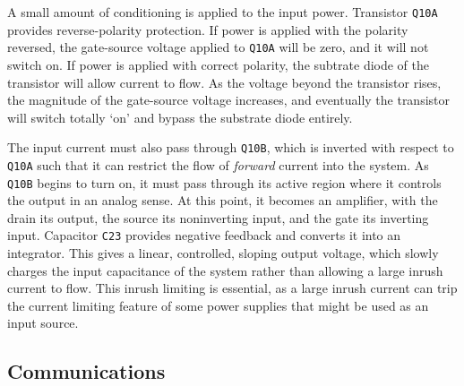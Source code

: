 \documentclass[a4paper,twocolumn,10pt,openany,oneside,final,fleqn]{memoir}
\newcommand{\rd}[1]{\texttt{#1}}
\begin{document}
A small amount of conditioning is applied to the input power. Transistor \rd{Q10A}
provides reverse-polarity protection. If power is applied with the polarity reversed,
the gate-source voltage applied to \rd{Q10A} will be zero, and it will not switch
on. If power is applied with correct polarity, the subtrate diode of the transistor
will allow current to flow. As the voltage beyond the transistor rises, the magnitude
of the gate-source voltage increases, and eventually the transistor will switch totally
`on' and bypass the substrate diode entirely.

The input current must also pass through \rd{Q10B}, which is inverted with respect
to \rd{Q10A} such that it can restrict the flow of \emph{forward} current into the
system. As \rd{Q10B} begins to turn on, it must pass through its active region where
it controls the output in an analog sense. At this point, it becomes an amplifier,
with the drain its output, the source its noninverting input, and the gate its
inverting input. Capacitor \rd{C23} provides negative feedback and converts it into
an integrator. This gives a linear, controlled, sloping output voltage, which
slowly charges the input capacitance of the system rather than allowing a large
inrush current to flow. This inrush limiting is essential, as a large inrush current
can trip the current limiting feature of some power supplies that might be used
as an input source.

\subsection{Communications}
\end{document}
